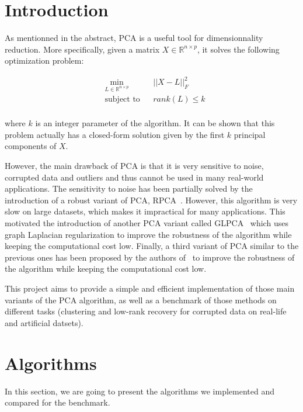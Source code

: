 \documentclass[sigconf]{acmart}
\begin{document}
\section{Introduction}

As mentionned in the abstract, PCA is a useful tool for dimensionnality reduction. More specifically, given a matrix $X \in \mathbb{R}^{n \times p}$, it solves the following optimization problem:

\begin{equation*}
  \begin{aligned}
  & \underset{L \in \mathbb{R}^{n \times p}}{\min}
  & & ||X - L||_F^2 \\
  & \text{subject to}
  & & rank(L) \leqslant k \\
  \end{aligned}
\end{equation*}

where $k$ is an integer parameter of the algorithm. It can be shown that this problem actually has a closed-form solution given by the first $k$ principal components of $X$.

However, the main drawback of PCA is that it is very sensitive to noise, corrupted data and outliers and thus cannot be used in many real-world applications.
The sensitivity to noise has been partially solved by the introduction of a robust variant of PCA, RPCA~\cite{rpca_paper}. However, this algorithm is very slow on large datasets, which makes it impractical for many applications. 
This motivated the introduction of another PCA variant called GLPCA~\cite{glpca_paper} which uses graph Laplacian regularization to improve the robustness of the algorithm while keeping the computational cost low.
Finally, a third variant of PCA similar to the previous ones has been proposed by the authors of~\cite{main_paper} to improve the robustness of the algorithm while keeping the computational cost low.

This project aims to provide a simple and efficient implementation of those main variants of the PCA algorithm, as well as a benchmark of those methods on different tasks (clustering and low-rank recovery for corrupted data on real-life and artificial datsets).

\section{Algorithms}

In this section, we are going to present the algorithms we implemented and compared for the benchmark.
\end{document}
